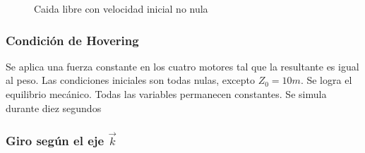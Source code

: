 \documentclass[main]{subfiles}
\begin{document}
\begin{figure} 
  \centering
 
  \caption{Caida libre con velocidad inicial no nula}
  \label{fig:caida_libre_vi}
\end{figure}


\subsubsection{Condici\'on de Hovering}

Se aplica una fuerza constante en los cuatro motores tal que la resultante es igual al peso. Las condiciones iniciales son todas nulas, excepto $Z_0=10m$. Se logra el equilibrio mec\'anico. Todas las variables permanecen constantes. Se simula durante diez segundos

\subsubsection{Giro seg\'un el eje $\vec{k}$}
\end{document}
